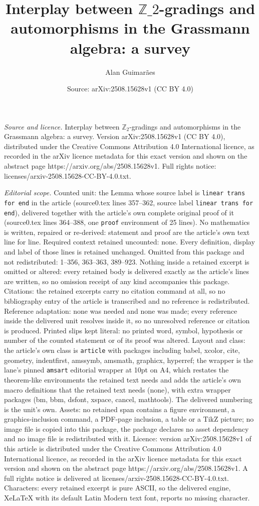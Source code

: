 \documentclass[10pt,a4paper]{amsart}
\title[Interplay between $\mathbb{Z}\_2$-gradings and automorphisms ]{Interplay between $\mathbb{Z}\_2$-gradings and automorphisms in the Grassmann algebra: a survey}
\author{Alan Guimar\~aes}
\date{Source: arXiv:2508.15628v1 (CC BY 4.0)}
\begin{document}
\maketitle

\noindent\emph{Source and licence.} Interplay between $\mathbb{Z}_2$-gradings and automorphisms in the Grassmann algebra: a survey. Version arXiv:2508.15628v1 (CC BY 4.0), distributed under the Creative Commons Attribution 4.0 International licence, as recorded in the arXiv licence metadata for this exact version and shown on the abstract page https://arxiv.org/abs/2508.15628v1. Full rights notice: licenses/arxiv-2508.15628-CC-BY-4.0.txt.\par\smallskip

\noindent\textit{Editorial scope.} Counted unit: the Lemma whose source label is \texttt{linear trans for end} in the article (source0.tex lines 357--362, source label \texttt{linear trans for end}), delivered together with the article's own complete original proof of it (source0.tex lines 364--388, one \texttt{proof} environment of 25 lines). No mathematics is written, repaired or re-derived: statement and proof are the article's own text line for line. Required context retained uncounted: none. Every definition, display and label of those lines is retained unchanged. Omitted from this package and not redistributed: 1--356, 363--363, 389--923. Nothing inside a retained excerpt is omitted or altered: every retained body is delivered exactly as the article's lines are written, so no omission receipt of any kind accompanies this package. Citations: the retained excerpts carry no citation command at all, so no bibliography entry of the article is transcribed and no reference is redistributed. Reference adaptation: none was needed and none was made; every reference inside the delivered unit resolves inside it, so no unresolved reference or citation is produced. Printed slips kept literal: no printed word, symbol, hypothesis or number of the counted statement or of its proof was altered. Layout and class: the article's own class is \texttt{article} with packages including babel, xcolor, cite, geometry, indentfirst, amssymb, amsmath, graphicx, hyperref; the wrapper is the lane's pinned \texttt{amsart} editorial wrapper at 10pt on A4, which restates the theorem-like environments the retained text needs and adds the article's own macro definitions that the retained text needs (none), with extra wrapper packages (bm, bbm, dsfont, xspace, cancel, mathtools). The delivered numbering is the unit's own. Assets: no retained span contains a figure environment, a graphics-inclusion command, a PDF-page inclusion, a table or a TikZ picture; no image file is copied into this package, the package declares no asset dependency and no image file is redistributed with it. Licence: version arXiv:2508.15628v1 of this article is distributed under the Creative Commons Attribution 4.0 International licence, as recorded in the arXiv licence metadata for this exact version and shown on the abstract page https://arxiv.org/abs/2508.15628v1. A full rights notice is delivered at licenses/arxiv-2508.15628-CC-BY-4.0.txt. Characters: every retained excerpt is pure ASCII, so the delivered engine, XeLaTeX with its default Latin Modern text font, reports no missing character.
\end{document}
